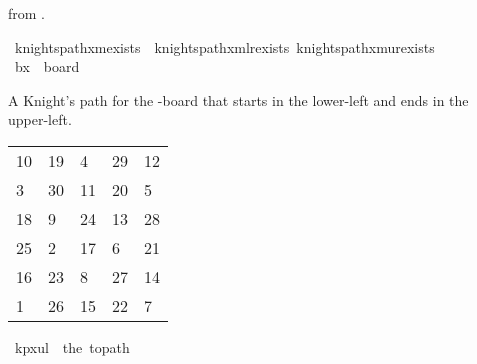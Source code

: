 \begin{isabellebody}
\begin{isamarkuptext}
from \cite{cull_decurtins_1987}.%
\end{isamarkuptext}\isamarkuptrue%
\isamarkupfalse%
\ knights{\isacharunderscore}{\kern0pt}path{\isacharunderscore}{\kern0pt}{}xm{\isacharunderscore}{\kern0pt}exists\ {\isacharequal}{\kern0pt}\ knights{\isacharunderscore}{\kern0pt}path{\isacharunderscore}{\kern0pt}{}xm{\isacharunderscore}{\kern0pt}lr{\isacharunderscore}{\kern0pt}exists\ knights{\isacharunderscore}{\kern0pt}path{\isacharunderscore}{\kern0pt}{}xm{\isacharunderscore}{\kern0pt}ur{\isacharunderscore}{\kern0pt}exists%
\isadelimdocument
%
\endisadelimdocument
%
\isatagdocument
%
\isamarkuptrue%
%
\endisatagdocument
{\isafolddocument}%
%
\isadelimdocument
%
\endisadelimdocument
{}\isamarkupfalse%
\ {\isachardoublequoteopen}b{}x{}\ {\isasymequiv}\ board\ {}\ {}{\isachardoublequoteclose}%
\begin{isamarkuptext}%
A Knight's path for the -board that starts in the lower-left and ends in the upper-left.
  \begin{table}[H]
    \begin{tabular}{lllll}
      10 & 19 &  4 & 29 & 12 \\
       3 & 30 & 11 & 20 &  5 \\
      18 &  9 & 24 & 13 & 28 \\
      25 &  2 & 17 &  6 & 21 \\
      16 & 23 &  8 & 27 & 14 \\
       1 & 26 & 15 & 22 &  7
    \end{tabular}
  \end{table}%
\end{isamarkuptext}\isamarkuptrue%
\isamarkupfalse%
\ {\isachardoublequoteopen}kp{}x{}ul\ {\isasymequiv}\ the\ {\isacharparenleft}{\kern0pt}to{\isacharunderscore}{\kern0pt}path\ \isanewline
\ \ {\isacharbrackleft}{\kern0pt}{\isacharbrackleft}{\kern0pt}{}{}{\isacharcomma}{\kern0pt}{}{}{\isacharcomma}{\kern0pt}{}{\isacharcomma}{\kern0pt}{}{}{\isacharcomma}{\kern0pt}{}{}{\isacharbrackright}{\kern0pt}{\isacharcomma}{\kern0pt}\isanewline
\ \ {\isacharbrackleft}{\kern0pt}{}{\isacharcomma}{\kern0pt}{}{}{\isacharcomma}{\kern0pt}{}{}{\isacharcomma}{\kern0pt}{}{}{\isacharcomma}{\kern0pt}{}{\isacharbrackright}{\kern0pt}{\isacharcomma}{\kern0pt}\isanewline

\end{isabellebody}
